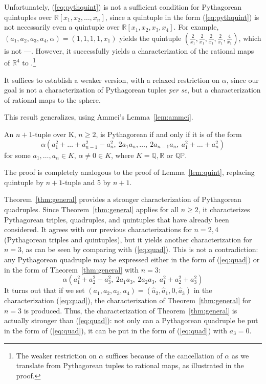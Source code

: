 \documentclass[12pt]{article}
\begin{document}
{   Unfortunately, 
   (\ref{eq:pythquint}) is not a sufficient condition for Pythagorean quintuples
   over $\mathbb{R}[x_1,x_2,\ldots,x_n]$, since
   a quintuple in the form (\ref{eq:pythquint}) is not necessarily
   even a quintuple over $\mathbb{R}[x_1,x_2,x_3,x_4]$.
   For example, $(a_1,a_2,a_3,a_4,\alpha) = (1,1,1,1,x_1)$ yields the
   quintuple $(\frac{2}{x_1}, \frac{2}{x_1}, \frac{2}{x_1}, \frac{2}{x_1}, \frac{4}{x_1})$,
   which is not ---.
   However, it successfully yields a characterization
   of the rational maps of $\mathbb{R}^4$ to .\footnote{The weaker restriction on $\alpha$
     suffices because of the cancellation of $\alpha$ as we translate from Pythagorean
     tuples to rational maps, as illustrated in the proof.}

   It suffices to establish a weaker version,
   with a relaxed restriction on $\alpha$,
   since our goal is not a characterization of Pythagorean tuples {\em per se},
   but a characterization of rational maps to the sphere.
} %

\noindent This result generalizes, using Ammei's Lemma~\ref{lem:ammei}.

\begin{theorem}
\label{thm:general}
An $n+1$-tuple over K, $n \geq 2$, is Pythagorean if and only if 
it is of the form 
\begin{equation}
\label{eq:pyth2}
	\alpha (a_1^2 + \ldots + a_{n-1}^2 - a_n^2,
		\ 2a_1a_n,\ldots,\ 2a_{n-1}a_n,
		\ a_1^2 + \ldots + a_n^2)
\end{equation}
for some $a_1,\ldots,a_n \in K$, $\alpha \neq 0 \in K$,
where $K = \mathbb{Q}, \mathbb{R}$ or $\mathbb{QP}$.
\end{theorem}
\prf
The proof is completely analogous to the proof of Lemma~\ref{lem:quint},
replacing quintuple by $n+1$-tuple and 5 by $n+1$.
\QED

Theorem~\ref{thm:general} provides a stronger characterization of
Pythagorean quadruples.
Since Theorem~\ref{thm:general} applies for all $n \geq 2$,
it characterizes Pythagorean triples, quadruples, and quintuples
that have already been considered.
It agrees with our previous characterizations for $n=2,4$ (Pythagorean triples
and quintuples),
but it yields another characterization for $n=3$, as can be seen 
by comparing with (\ref{eq:quad}).
This is not a contradiction: any Pythagorean quadruple
may be expressed either in the form of (\ref{eq:quad})
or in the form of Theorem~\ref{thm:general} with $n=3$:
\[
\alpha (a_1^2 + a_{2}^2 - a_3^2, \ 2a_1a_3,\ 2a_2a_3, \ a_1^2 + a_2^2 + a_3^2)
\]
%
It turns out that if we set 
$(a_1,a_2,a_3,a_4) = (\hat{a}_2, \hat{a}_1, 0, \hat{a}_3)$
in the characterization (\ref{eq:quad}),
the characterization of Theorem~\ref{thm:general} for $n=3$ is produced.
Thus, the characterization of Theorem~\ref{thm:general} is actually stronger than
(\ref{eq:quad}): not only can a Pythagorean quadruple
be put in the form of (\ref{eq:quad}), it can be put in the form
of (\ref{eq:quad}) with $a_3=0$.
\end{document}
